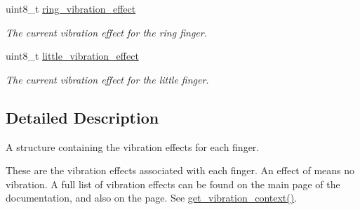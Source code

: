 \begin{DoxyCompactItemize}
uint8\+\_\+t \hyperlink{struct_vibration_context_a6189a49a15db4bfafefa9454581b1830}{ring\+\_\+vibration\+\_\+effect}
\begin{DoxyCompactList}\small\item\em The current vibration effect for the ring finger. \end{DoxyCompactList}\item 
\mbox{\label{struct_vibration_context_aaefee7d196d4c1870c1c0a1f0a84d0e6}} 
uint8\+\_\+t \hyperlink{struct_vibration_context_aaefee7d196d4c1870c1c0a1f0a84d0e6}{little\+\_\+vibration\+\_\+effect}
\begin{DoxyCompactList}\small\item\em The current vibration effect for the little finger. \end{DoxyCompactList}\end{DoxyCompactItemize}


\subsection{Detailed Description}
A structure containing the vibration effects for each finger. 

These are the vibration effects associated with each finger. An effect of {} means no vibration. A full list of vibration effects can be found on the main page of the documentation, and also on the  page. See {\ttfamily \hyperlink{group__vibration_control_ga578e2f96e86827fd32c9e8e181cf4c64}{get\+\_\+vibration\+\_\+context()}}. 